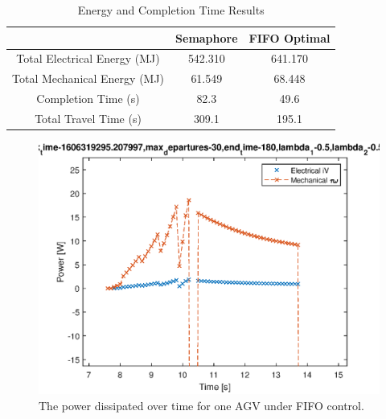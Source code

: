 \documentclass[]{article}
\begin{document}
\begin{table}
	\begin{tabular}{|c|c|c|}
		\hline
		& Semaphore & FIFO Optimal \\
		\hline
		Total Electrical Energy (MJ) & 542.310& 641.170\\
		Total Mechanical Energy (MJ) & 61.549& 68.448\\
		Completion Time (s) & 82.3 & 49.6\\
		Total Travel Time (s) & 309.1 & 195.1 \\
		\hline
	\end{tabular}
	\label{tab:energy_res}
	\caption{Energy and Completion Time Results }
\end{table}

\begin{figure}
	\includegraphics[width=1.0\linewidth]{agv_e_021088_power_-FIFO-HighLatency-HighTraffic.eps}
	\caption{The power dissipated over time for one AGV under FIFO control.}
	\label{fig:021088power}       %
\end{figure}
\end{document}
